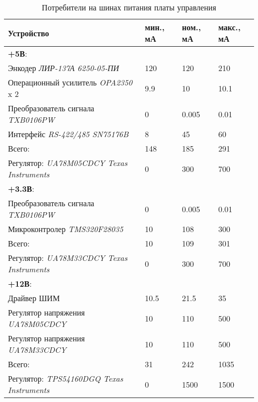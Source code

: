\begin{table}[ht!]
    \centering
    \begin{tabu}{|X[l,m]|X[-1,c,m]|X[-1,c,m]|X[-1,c,m]|}
        \hline
        Устройство & мин., мА & ном., мА  & макс., мА \\
        \hline \hline
        \textbf{+5В}: &&& \\
        Энкодер \textit{ЛИР-137А 6250-05-ПИ}        & 120 & 120   & 210  \\
        Операционный усилитель \textit{OPA2350} x 2 & 9.9 & 10    & 10.1 \\
        Преобразователь сигнала \textit{TXB0106PW}  & 0   & 0.005 & 0.01 \\
        Интерфейс \textit{RS-422/485 SN75176B}      & 8   & 45    & 60   \\
        \hline
        Всего: & 148 & 185 & 291 \\
        \hline
        Регулятор:
        \textit{UA78M05CDCY \foreignlanguage{english}{Texas Instruments}} & 0 & 300 & 700 \\

        \hline \hline
        \textbf{+3.3В}: &&& \\
        Преобразователь сигнала \textit{TXB0106PW} & 0  & 0.005 & 0.01 \\
        Микроконтролер \textit{TMS320F28035}       & 10 & 108   & 300  \\
        \hline
        Всего: & 10 & 109 & 301 \\
        \hline
        Регулятор:
        \textit{UA78M33CDCY \foreignlanguage{english}{Texas Instruments}} & 0 & 300 & 700 \\

        \hline \hline
        \textbf{+12В}: &&& \\
        Драйвер ШИМ                               & 10.5 & 21.5 & 35  \\
        Регулятор напряжения \textit{UA78M05CDCY} & 10   & 110  & 500 \\
        Регулятор напряжения \textit{UA78M33CDCY} & 10   & 110  & 500 \\
        \hline
        Всего: & 31 & 242 & 1035 \\
        \hline
        Регулятор:
        \textit{TPS54160DGQ \foreignlanguage{english}{Texas Instruments}} & 0 & 1500 & 1500 \\

        \hline
    \end{tabu}
    \caption{Потребители на шинах питания платы управления}
    \label{powerConsumersOnBoard}
\end{table}

